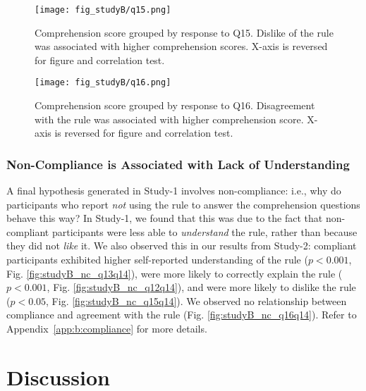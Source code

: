 \documentclass{article}
\newcommand{\studyA}{Study-1}
\newcommand{\studyB}{Study-2}
\newcommand{\Appref}[1]{Appendix~\ref{#1}}
\begin{document}
\begin{figure}[t]
    \centering
    \texttt{[image: fig\_studyB/q15.png]}
    \vspace{-15pt}
    \caption{Comprehension score grouped by response to Q15. Dislike of the rule was associated with higher comprehension scores. X-axis is reversed for figure and correlation test.}
    \label{fig:studyB_q15}
    \vspace{10pt}
\end{figure}

\begin{figure}[t]
    \centering
    \texttt{[image: fig\_studyB/q16.png]}
    \vspace{-15pt}
    \caption{Comprehension score grouped by response to Q16. Disagreement with the rule was associated with higher comprehension score. X-axis is reversed for figure and correlation test.}
    \label{fig:studyB_q16}
    \vspace{-10pt}
\end{figure}


\subsubsection{Non-Compliance is Associated with Lack of Understanding} \label{results:b:non-comp}

A final hypothesis generated in \studyA{} involves non-compliance: i.e., why do participants who report \textit{not} using the rule to answer the comprehension questions behave this way? 
In \studyA{}, we found that this was due to the fact that non-compliant participants were less able to \textit{understand} the rule, rather than because they did not \textit{like} it. 
We also observed this in our results from \studyB{}:
compliant participants exhibited higher self-reported understanding of the rule ($p < 0.001$, Fig. \ref{fig:studyB_nc_q13q14}), were more likely to correctly explain the rule ($p < 0.001$, Fig. \ref{fig:studyB_nc_q12q14}), and were more likely to dislike the rule ($p < 0.05$, Fig. \ref{fig:studyB_nc_q15q14}). We observed no relationship between compliance and agreement with the rule (Fig. \ref{fig:studyB_nc_q16q14}). Refer to \Appref{app:b:compliance} for more details.




\section{Discussion} \label{sec:discussion}
\end{document}
